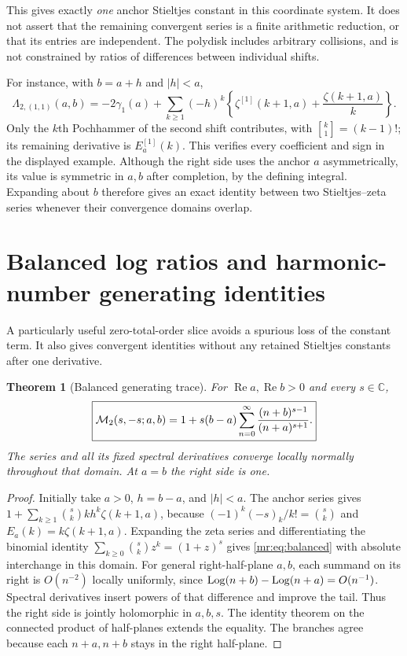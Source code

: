 \documentclass[11pt,letterpaper]{article}
\newtheorem{theorem}{Theorem}[section]
\theoremstyle{definition}\newtheorem{definition}[theorem]{Definition}
\theoremstyle{remark}\newtheorem{remark}[theorem]{Remark}
\newcommand{\C}{\mathbb C}\newcommand{\R}{\mathbb R}\newcommand{\N}{\mathbb N}
\newcommand{\Rea}{\operatorname{Re}}\newcommand{\Ima}{\operatorname{Im}}
\newcommand{\stir}[2]{\genfrac{[}{]}{0pt}{}{#1}{#2}}
\begin{document}
This gives exactly \emph{one} anchor Stieltjes constant in this coordinate
system. It does not assert that the remaining convergent series is a
finite arithmetic reduction, or that its entries are independent.
The polydisk includes arbitrary collisions, and is not constrained by
ratios of differences between individual shifts.

For instance, with $b=a+h$ and $|h|<a$,
\begin{equation}\label{mr:eq:bilog}
 \boxed{\Lambda_{2,(1,1)}(a,b)
 =-2\gamma_1(a)+\sum_{k\ge1}(-h)^k
    \left\{\zeta^{[1]}(k+1,a)+\frac{\zeta(k+1,a)}k\right\}.}
\end{equation}
Only the $k$th Pochhammer of the second shift contributes, with
$\stir{k}{1}=(k-1)!$; its remaining derivative is $E_a^{[1]}(k)$.
This verifies every coefficient and sign in the displayed example.
Although the right side uses the anchor $a$ asymmetrically, its value is
symmetric in $a,b$ after completion, by the defining integral. Expanding
about $b$ therefore gives an exact identity between two Stieltjes--zeta
series whenever their convergence domains overlap.

\section{Balanced log ratios and harmonic-number generating identities}
\label{mr:sec:balanced}
A particularly useful zero-total-order slice avoids a spurious loss of
the constant term. It also gives convergent identities without any
retained Stieltjes constants after one derivative.

\begin{theorem}[Balanced generating trace]\label{mr:thm:balanced}
For $\Rea a,\Rea b>0$ and every $s\in\C$,
\begin{equation}\label{mr:eq:balanced}
 \boxed{\mathcal M_2(s,-s;a,b)=1+s(b-a)
     \sum_{n=0}^\infty\frac{(n+b)^{s-1}}{(n+a)^{s+1}}.}
\end{equation}
The series and all its fixed spectral derivatives converge locally
normally throughout that domain. At $a=b$ the right side is one.
\end{theorem}
\begin{proof}
Initially take $a>0$, $h=b-a$, and $|h|<a$. The anchor series gives
$1+\sum_{k\ge1}\binom{s}{k}kh^k\zeta(k+1,a)$, because
$(-1)^k(-s)_k/k!=\binom{s}{k}$ and $E_a(k)=k\zeta(k+1,a)$.
Expanding the zeta series and differentiating the binomial identity
$\sum_{k\ge0}\binom{s}{k}z^k=(1+z)^s$ gives
\eqref{mr:eq:balanced} with absolute interchange in this domain.
For general right-half-plane $a,b$, each summand on its right is
$O(n^{-2})$ locally uniformly, since
$\operatorname{Log}(n+b)-\operatorname{Log}(n+a)=O(n^{-1})$. Spectral derivatives insert powers
of that difference and improve the tail. Thus the right side is jointly
holomorphic in $a,b,s$. The identity theorem on the connected product
of half-planes extends the equality. The branches agree because each
$n+a,n+b$ stays in the right half-plane.
\end{proof}
\end{document}
